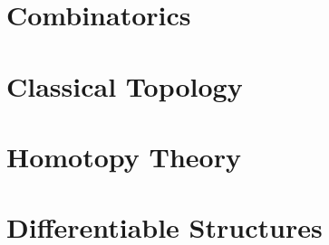 



\part{Combinatorics}



\part{Classical Topology}



\part{Homotopy Theory}



\part{Differentiable Structures}





\appendix

% 




\printbibliography


